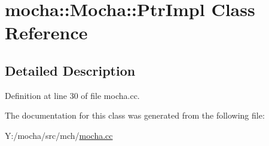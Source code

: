 \hypertarget{classmocha_1_1_mocha_1_1_ptr_impl}{
\section{mocha::Mocha::PtrImpl Class Reference}
\label{classmocha_1_1_mocha_1_1_ptr_impl}
}


\subsection{Detailed Description}


Definition at line 30 of file mocha.cc.



The documentation for this class was generated from the following file:\begin{DoxyCompactItemize}
\item 
Y:/mocha/src/mch/\hyperlink{mocha_8cc}{mocha.cc}\end{DoxyCompactItemize}
